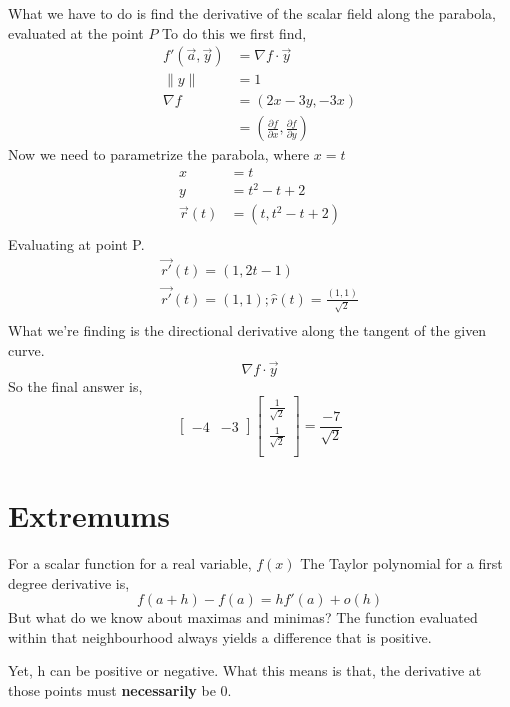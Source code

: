 \documentclass[twoside]{report}
\begin{document}
What we have to do is find the derivative of the scalar field along the parabola, evaluated at the point $P$
To do this we first find, 
\begin{align*}
	f'(\vec{a}, \vec{y}) &= \nabla f \cdot \vec{y} \\
	\|y\| &= 1 \\
	\nabla f &= (2x-3y,-3x) \\
		 &= (\frac{\partial f}{\partial x}, \frac{\partial f}{\partial y})
\end{align*}
Now we need to parametrize the parabola, where $x = t$
\begin{align*}
	x &= t \\
	y &= t^2 - t + 2\\
	\vec{r}(t) &= (t, t^2 - t + 2) \\
\end{align*}
Evaluating at point P.
\begin{align*}
	\vec{r'}(t) = (1,2t-1)\\
	\vec{r'}(t) = (1,1); \hat{r}(t) = \frac{(1,1)}{\sqrt{2}} \\
\end{align*}
What we're finding is the directional derivative along the tangent of the given curve. 
\[
	\nabla f \cdot \vec{y}
\]
So the final answer is,
\[ 
	\begin{bmatrix}
		-4 & -3
	\end{bmatrix}
	\begin{bmatrix}
		\frac{1}{\sqrt{2}}	\\
		\frac{1}{\sqrt{2}} \\
	\end{bmatrix}
	= \frac{-7}{\sqrt{2}}
\]
\section{Extremums}
For a scalar function for a real variable, $f(x)$
The Taylor polynomial for a first degree derivative is,
\[ 
	f(a+h) - f(a) = hf'(a) + o(h)
\]
But what do we know about maximas and minimas? The function evaluated within that neighbourhood always yields a difference that is positive.

Yet, h can be positive or negative. What this means is that, the derivative at those points must \textbf{necessarily} be 0.
\end{document}
